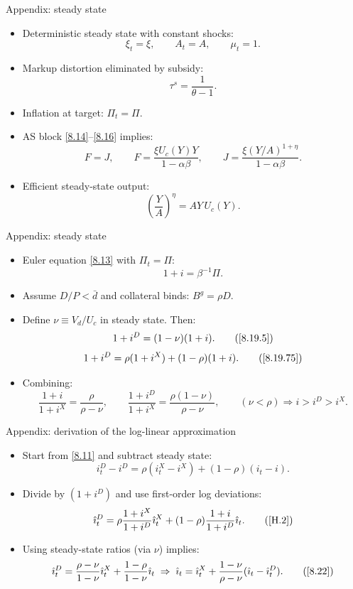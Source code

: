 \documentclass[11pt,aspectratio=169]{beamer}
\begin{document}
\begin{frame}[label=Appendix H]{Appendix: steady state}
\small
\begin{itemize}
  \item Deterministic steady state with constant shocks:
  \[
    \xi_t = \xi,\qquad A_t = A,\qquad \mu_t = 1.
  \]
  \item Markup distortion eliminated by subsidy:
  \[
    \tau^s=\frac{1}{\theta-1}.
  \]
  \item Inflation at target: $\Pi_t=\Pi$.
  \item AS block \eqref{8.14}--\eqref{8.16} implies:
  \[
    F=J,\qquad
    F=\frac{\xi U_c(Y)Y}{1-\alpha\beta},\qquad
    J=\frac{\xi(Y/A)^{1+\eta}}{1-\alpha\beta}.
  \]
  \item Efficient steady-state output:
  \[
    \left(\frac{Y}{A}\right)^\eta = AY\,U_c(Y).
  \]
\end{itemize}
\end{frame}

\begin{frame}{Appendix: steady state}
\begin{itemize}
  \item Euler equation \eqref{8.13} with $\Pi_t=\Pi$:
  \[
    1+i=\beta^{-1}\Pi.
  \]
  \item Assume $D/P<\bar d$ and collateral binds: $B^g=\rho D$.
  \item Define $\nu\equiv V_d/U_c$ in steady state. Then:
  \[
    1+i^D=(1-\nu)(1+i). \tag{\ref{8.19.5}}
  \]
  \[
    1+i^D=\rho(1+i^X)+(1-\rho)(1+i). \tag{\ref{8.19.75}}
  \]
  \item Combining:
  \[
    \frac{1+i}{1+i^X}=\frac{\rho}{\rho-\nu},\qquad
    \frac{1+i^D}{1+i^X}=\frac{\rho(1-\nu)}{\rho-\nu},
    \qquad (\nu<\rho)\Rightarrow i>i^D>i^X.
  \]
\end{itemize}
\end{frame}

\begin{frame}{Appendix: derivation of the log-linear approximation}
\begin{itemize}
  \item Start from \eqref{8.11} and subtract steady state:
  \[
    i_t^D - i^D = \rho(i_t^X - i^X) + (1-\rho)(i_t - i).
  \]
  \item Divide by $(1+i^D)$ and use first-order log deviations:
  \[
    \hat\imath_t^D
    = \rho\frac{1+i^X}{1+i^D}\hat\imath_t^X
      + (1-\rho)\frac{1+i}{1+i^D}\hat\imath_t. \tag{\ref{H.2}}
  \]
  \item Using steady-state ratios (via $\nu$) implies:
  \[
    \hat\imath_t^D
    = \frac{\rho-\nu}{1-\nu}\hat\imath_t^X
      + \frac{1-\rho}{1-\nu}\hat\imath_t
    \;\Rightarrow\;
    \hat\imath_t
    = \hat\imath_t^X
      + \frac{1-\nu}{\rho-\nu}(\hat\imath_t-\hat\imath_t^D). \tag{\ref{8.22}}
  \]
\end{itemize}
\end{frame}
\end{document}

